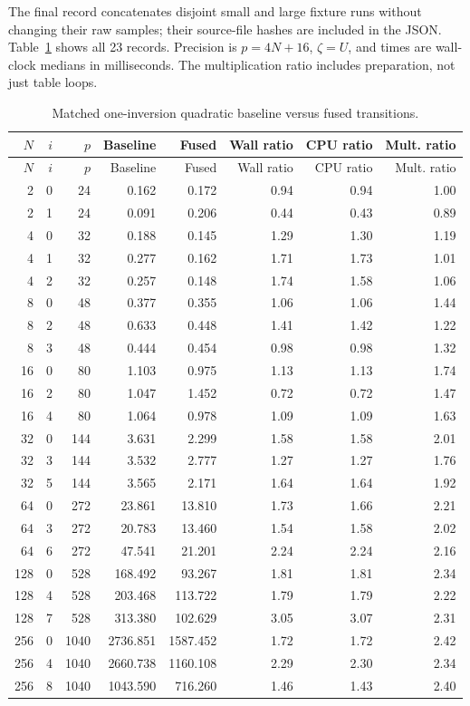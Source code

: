 \documentclass[11pt,letterpaper]{article}
\theoremstyle{remark}\newtheorem{remark}[theorem]{Remark}
\begin{document}
The final record concatenates disjoint small and large fixture runs without
changing their raw samples; their source-file hashes are included in the JSON.
Table~\ref{tab:fused-times} shows all 23 records. Precision is $p=4N+16$,
$\zeta=U$, and times are wall-clock medians in milliseconds. The multiplication
ratio includes preparation, not just table loops.
\begingroup\small
\begin{longtable}{@{}rrrrrrrr@{}}
\caption{Matched one-inversion quadratic baseline versus fused transitions.}\label{tab:fused-times}\\
\toprule
$N$&$i$&$p$&Baseline&Fused&Wall ratio&CPU ratio&Mult. ratio\\\midrule\endfirsthead
\toprule
$N$&$i$&$p$&Baseline&Fused&Wall ratio&CPU ratio&Mult. ratio\\\midrule\endhead
2 & 0 & 24 & 0.162 & 0.172 & 0.94 & 0.94 & 1.00 \\
2 & 1 & 24 & 0.091 & 0.206 & 0.44 & 0.43 & 0.89 \\
4 & 0 & 32 & 0.188 & 0.145 & 1.29 & 1.30 & 1.19 \\
4 & 1 & 32 & 0.277 & 0.162 & 1.71 & 1.73 & 1.01 \\
4 & 2 & 32 & 0.257 & 0.148 & 1.74 & 1.58 & 1.06 \\
8 & 0 & 48 & 0.377 & 0.355 & 1.06 & 1.06 & 1.44 \\
8 & 2 & 48 & 0.633 & 0.448 & 1.41 & 1.42 & 1.22 \\
8 & 3 & 48 & 0.444 & 0.454 & 0.98 & 0.98 & 1.32 \\
16 & 0 & 80 & 1.103 & 0.975 & 1.13 & 1.13 & 1.74 \\
16 & 2 & 80 & 1.047 & 1.452 & 0.72 & 0.72 & 1.47 \\
16 & 4 & 80 & 1.064 & 0.978 & 1.09 & 1.09 & 1.63 \\
32 & 0 & 144 & 3.631 & 2.299 & 1.58 & 1.58 & 2.01 \\
32 & 3 & 144 & 3.532 & 2.777 & 1.27 & 1.27 & 1.76 \\
32 & 5 & 144 & 3.565 & 2.171 & 1.64 & 1.64 & 1.92 \\
64 & 0 & 272 & 23.861 & 13.810 & 1.73 & 1.66 & 2.21 \\
64 & 3 & 272 & 20.783 & 13.460 & 1.54 & 1.58 & 2.02 \\
64 & 6 & 272 & 47.541 & 21.201 & 2.24 & 2.24 & 2.16 \\
128 & 0 & 528 & 168.492 & 93.267 & 1.81 & 1.81 & 2.34 \\
128 & 4 & 528 & 203.468 & 113.722 & 1.79 & 1.79 & 2.22 \\
128 & 7 & 528 & 313.380 & 102.629 & 3.05 & 3.07 & 2.31 \\
256 & 0 & 1040 & 2736.851 & 1587.452 & 1.72 & 1.72 & 2.42 \\
256 & 4 & 1040 & 2660.738 & 1160.108 & 2.29 & 2.30 & 2.34 \\
256 & 8 & 1040 & 1043.590 & 716.260 & 1.46 & 1.43 & 2.40 \\
\bottomrule\end{longtable}\endgroup
\end{document}
